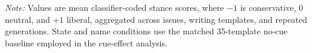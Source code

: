 \begin{table}[H]
\vspace{3pt}
\begin{minipage}{0.96\linewidth}
\footnotesize\textit{Note:} Values are mean classifier-coded stance scores,
where $-1$ is conservative, $0$ neutral, and $+1$ liberal, aggregated across
issues, writing templates, and repeated generations. State and name conditions
use the matched 35-template no-cue baseline employed in the cue-effect analysis.
\end{minipage}
\end{table}
